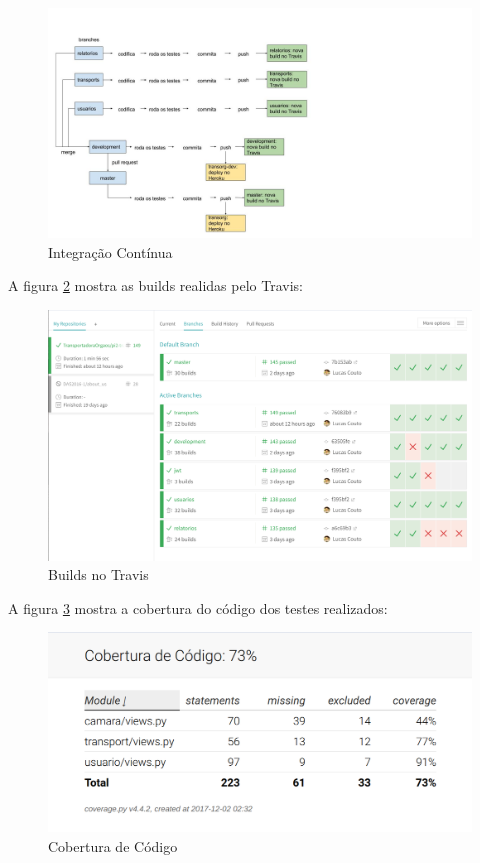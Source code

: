 \begin{figure}[H]
	\centering
	\includegraphics[width=24cm]{figuras/integracao_continua.jpg}
	\caption{Integração Contínua} \label{integra_continua}
\end{figure}

A figura \ref{travis} mostra as builds realidas pelo Travis:

\begin{figure}[H]
	\centering
	\includegraphics[width=16cm]{figuras/travis.png}
	\caption{Builds no Travis} \label{travis}
\end{figure}

A figura \ref{cobertura_codigo} mostra a cobertura do código dos testes realizados:

\begin{figure}[H]
	\centering
	\includegraphics[width=14cm]{figuras/cobertura_codigo.png}
	\caption{Cobertura de Código} \label{cobertura_codigo}
\end{figure}




